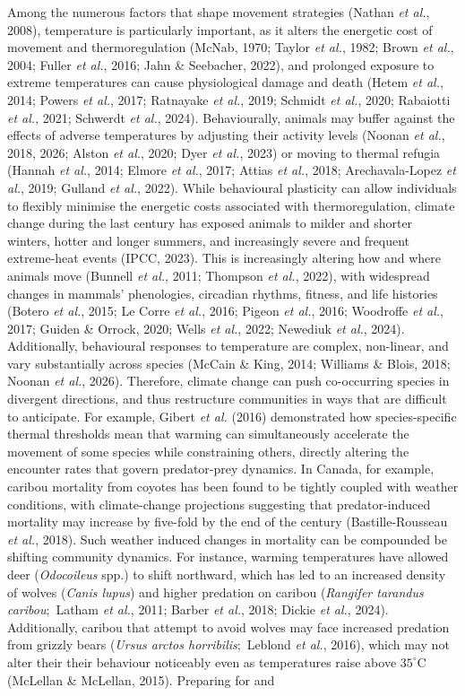 \documentclass[
  12pt,
]{article}
\begin{document}
Among the numerous factors that shape movement strategies (Nathan \emph{et al.}, 2008), temperature is particularly important, as it alters the energetic cost of movement and thermoregulation (McNab, 1970; Taylor \emph{et al.}, 1982; Brown \emph{et al.}, 2004; Fuller \emph{et al.}, 2016; Jahn \& Seebacher, 2022), and prolonged exposure to extreme temperatures can cause physiological damage and death (Hetem \emph{et al.}, 2014; Powers \emph{et al.}, 2017; Ratnayake \emph{et al.}, 2019; Schmidt \emph{et al.}, 2020; Rabaiotti \emph{et al.}, 2021; Schwerdt \emph{et al.}, 2024). Behaviourally, animals may buffer against the effects of adverse temperatures by adjusting their activity levels (Noonan \emph{et al.}, 2018, 2026; Alston \emph{et al.}, 2020; Dyer \emph{et al.}, 2023) or moving to thermal refugia (Hannah \emph{et al.}, 2014; Elmore \emph{et al.}, 2017; Attias \emph{et al.}, 2018; Arechavala-Lopez \emph{et al.}, 2019; Gulland \emph{et al.}, 2022). While behavioural plasticity can allow individuals to flexibly minimise the energetic costs associated with thermoregulation, climate change during the last century has exposed animals to milder and shorter winters, hotter and longer summers, and increasingly severe and frequent extreme-heat events (IPCC, 2023). This is increasingly altering how and where animals move (Bunnell \emph{et al.}, 2011; Thompson \emph{et al.}, 2022), with widespread changes in mammals' phenologies, circadian rhythms, fitness, and life histories (Botero \emph{et al.}, 2015; Le Corre \emph{et al.}, 2016; Pigeon \emph{et al.}, 2016; Woodroffe \emph{et al.}, 2017; Guiden \& Orrock, 2020; Wells \emph{et al.}, 2022; Newediuk \emph{et al.}, 2024). Additionally, behavioural responses to temperature are complex, non-linear, and vary substantially across species (McCain \& King, 2014; Williams \& Blois, 2018; Noonan \emph{et al.}, 2026). Therefore, climate change can push co-occurring species in divergent directions, and thus restructure communities in ways that are difficult to anticipate. For example, Gibert \emph{et al.} (2016) demonstrated how species-specific thermal thresholds mean that warming can simultaneously accelerate the movement of some species while constraining others, directly altering the encounter rates that govern predator-prey dynamics. In Canada, for example, caribou mortality from coyotes has been found to be tightly coupled with weather conditions, with climate-change projections suggesting that predator-induced mortality may increase by five-fold by the end of the century (Bastille-Rousseau \emph{et al.}, 2018). Such weather induced changes in mortality can be compounded be shifting community dynamics. For instance, warming temperatures have allowed deer (\emph{Odocoileus} spp.) to shift northward, which has led to an increased density of wolves (\emph{Canis lupus}) and higher predation on caribou (\emph{Rangifer tarandus caribou}\(;\) Latham \emph{et al.}, 2011; Barber \emph{et al.}, 2018; Dickie \emph{et al.}, 2024). Additionally, caribou that attempt to avoid wolves may face increased predation from grizzly bears (\emph{Ursus arctos horribilis}\(;\) Leblond \emph{et al.}, 2016), which may not alter their their behaviour noticeably even as temperatures raise above \(35^\circ\text{C}\) (McLellan \& McLellan, 2015). Preparing for and 
\end{document}
